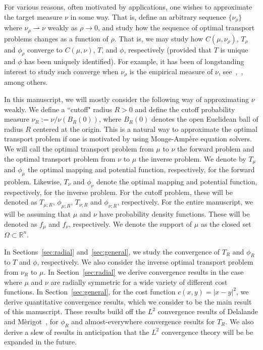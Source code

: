 \documentclass{amsart}
\theoremstyle{lemma}
\theoremstyle{remark}
\begin{document}
For various reasons, often motivated by applications, one wishes to approximate the target measure $\nu$ in some way. That is, define an arbitrary sequence $\{ \nu_{\rho} \}$ where $\nu_{\rho} \rightharpoonup \nu$ weakly as $\rho \rightarrow 0$, and study how the sequence of optimal transport problems changes as a function of $\rho$. That is, we may study how $C(\mu, \nu_{\rho})$, $T_{\rho}$ and $\phi_{\rho}$ converge to $C(\mu, \nu)$, $T$, and $\phi$, respectively (provided that $T$ is unique and $\phi$ has been uniquely identified). For example, it has been of longstanding interest to study such converge when $\nu_{\rho}$ is the empirical measure of $\nu$, see~\cite{berman},~\cite{stabilitywenbo}, among others.

In this manuscript, we will mostly consider the following way of approximating $\nu$ weakly. We define a ``cutoff" radius $R>0$ and define the cutoff probability measure $\nu_{R} := \nu/\nu(B_{R}(0))$, where $B_{R}(0)$ denotes the open Euclidean ball of radius $R$ centered at the origin. This is a natural way to approximate the optimal transport problem if one is motivated by using Monge-Amp\`{e}re equation solvers. We will call the optimal transport problem from $\mu$ to $\nu$ the forward problem and the optimal transport problem from $\nu$ to $\mu$ the inverse problem. We denote by $T_{\mu}$ and $\phi_{\mu}$ the optimal mapping and potential function, respectively, for the forward problem. Likewise, $T_{\nu}$ and $\phi_{\nu}$ denote the optimal mapping and potential function, respectively, for the inverse problem. For the cutoff problem, these will be denoted as $T_{\mu; R}$, $\phi_{\mu; R}$, $T_{\nu; R}$ and $\phi_{\nu; R}$, respectively. For the entire manuscript, we will be assuming that $\mu$ and $\nu$ have probability density functions. These will be denoted as $f_{\mu}$ and $f_{\nu}$, respectively. We denote the support of $\mu$ as the closed set $\Omega \subset \mathbb{R}^n$.

In Sections~\ref{sec:radial} and~\ref{sec:general}, we study the convergence of $T_{R}$ and $\phi_{R}$ to $T$ and $\phi$, respectively. We also consider the inverse optimal transport problem from $\nu_{R}$ to $\mu$. In Section~\ref{sec:radial} we derive convergence results in the case where $\mu$ and $\nu$ are radially symmetric for a wide variety of different cost functions. In Section~\ref{sec:general}, for the cost function $c(x,y) = \vert x - y \vert^2$, we derive quantitative convergence results, which we consider to be the main result of this manuscript. These results build off the $L^2$ convergence results of Delalande and M\`{e}rigot~\cite{merigot1}, for $\phi_{R}$ and almost-everywhere convergence results for $T_{R}$. We also derive a slew of results in anticipation that the $L^2$ convergence theory will be be expanded in the future.
\end{document}
